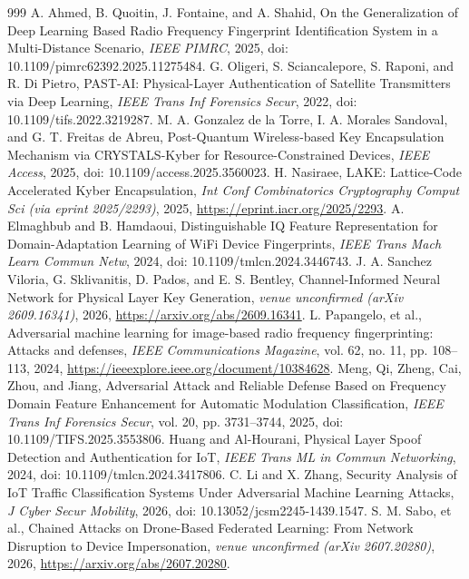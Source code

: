 \documentclass[10.5pt,compsoc,winfonts]{ICN}
\begin{document}
\begin{thebibliography}{999}
A. Ahmed, B. Quoitin, J. Fontaine, and A. Shahid, On the Generalization of Deep Learning Based Radio Frequency Fingerprint Identification System in a Multi-Distance Scenario, \emph{IEEE PIMRC}, 2025, doi: 10.1109/pimrc62392.2025.11275484.
G. Oligeri, S. Sciancalepore, S. Raponi, and R. Di Pietro, PAST-AI: Physical-Layer Authentication of Satellite Transmitters via Deep Learning, \emph{IEEE Trans Inf Forensics Secur}, 2022, doi: 10.1109/tifs.2022.3219287.
M. A. Gonzalez de la Torre, I. A. Morales Sandoval, and G. T. Freitas de Abreu, Post-Quantum Wireless-based Key Encapsulation Mechanism via CRYSTALS-Kyber for Resource-Constrained Devices, \emph{IEEE Access}, 2025, doi: 10.1109/access.2025.3560023.
H. Nasiraee, LAKE: Lattice-Code Accelerated Kyber Encapsulation, \emph{Int Conf Combinatorics Cryptography Comput Sci (via eprint 2025/2293)}, 2025, \url{https://eprint.iacr.org/2025/2293}.
A. Elmaghbub and B. Hamdaoui, Distinguishable IQ Feature Representation for Domain-Adaptation Learning of WiFi Device Fingerprints, \emph{IEEE Trans Mach Learn Commun Netw}, 2024, doi: 10.1109/tmlcn.2024.3446743.
J. A. Sanchez Viloria, G. Sklivanitis, D. Pados, and E. S. Bentley, Channel-Informed Neural Network for Physical Layer Key Generation, \emph{venue unconfirmed (arXiv 2609.16341)}, 2026, \url{https://arxiv.org/abs/2609.16341}.
L. Papangelo, et al., Adversarial machine learning for image-based radio frequency fingerprinting: Attacks and defenses, \emph{IEEE Communications Magazine}, vol. 62, no. 11, pp. 108–113, 2024, \url{https://ieeexplore.ieee.org/document/10384628}.
Meng, Qi, Zheng, Cai, Zhou, and Jiang, Adversarial Attack and Reliable Defense Based on Frequency Domain Feature Enhancement for Automatic Modulation Classification, \emph{IEEE Trans Inf Forensics Secur}, vol. 20, pp. 3731–3744, 2025, doi: 10.1109/TIFS.2025.3553806.
Huang and Al-Hourani, Physical Layer Spoof Detection and Authentication for IoT, \emph{IEEE Trans ML in Commun Networking}, 2024, doi: 10.1109/tmlcn.2024.3417806.
C. Li and X. Zhang, Security Analysis of IoT Traffic Classification Systems Under Adversarial Machine Learning Attacks, \emph{J Cyber Secur Mobility}, 2026, doi: 10.13052/jcsm2245-1439.1547.
S. M. Sabo, et al., Chained Attacks on Drone-Based Federated Learning: From Network Disruption to Device Impersonation, \emph{venue unconfirmed (arXiv 2607.20280)}, 2026, \url{https://arxiv.org/abs/2607.20280}.

\end{thebibliography}
\end{document}
